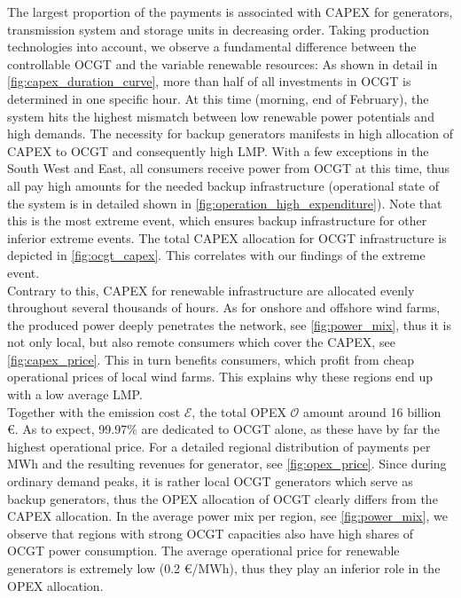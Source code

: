 \documentclass[11pt,twocolumn]{article}
\newcommand{\opex}{\mathcal{O}}
\newcommand{\emissioncost}{\mathcal{E}}
\begin{document}
The largest proportion of the payments is associated with CAPEX for generators, transmission system and storage units in decreasing order. 
Taking production technologies into account, we observe a fundamental difference between the controllable OCGT  and the variable renewable resources: As shown in detail in \cref{fig:capex_duration_curve}, more than half of all investments in OCGT is determined in one specific hour. At this time (morning, end of February), the system hits the highest mismatch between low renewable power potentials and high demands. The necessity for backup generators manifests in high allocation of CAPEX to OCGT and consequently high LMP. With a few exceptions in the South West and East, all consumers receive power from OCGT at this time, thus all pay high amounts for the needed backup infrastructure (operational state of the system is in detailed shown in \cref{fig:operation_high_expenditure}). Note that this is the most extreme event, which ensures backup infrastructure for other inferior extreme events. The total CAPEX allocation for OCGT infrastructure is depicted in \cref{fig:ocgt_capex}. This  correlates with our findings of the extreme event. \\
Contrary to this, CAPEX for renewable infrastructure are allocated evenly throughout several thousands of hours. As for onshore and offshore wind farms, the produced power deeply penetrates the network, see \cref{fig:power_mix}, thus it is not only local, but also remote consumers which cover the CAPEX, see \cref{fig:capex_price}. This in turn benefits consumers, which profit from cheap operational prices of local wind farms. This explains why these regions end up with a low average LMP.\\

Together with the emission cost $\emissioncost$, the total OPEX $\opex$ amount around 16 billion \euro. As to expect, 99.97\% are dedicated to OCGT alone, as these have by far the highest operational price. For a detailed regional distribution of payments per MWh and the resulting revenues for generator, see \cref{fig:opex_price}. Since during ordinary demand peaks, it is rather local OCGT generators which serve as backup generators, thus the OPEX allocation of OCGT clearly differs from the CAPEX allocation. In the average power mix per region, see \cref{fig:power_mix}, we observe that regions with strong OCGT capacities also  have high shares of OCGT power consumption. The average operational price for renewable generators is extremely low (0.2 \euro/MWh), thus they play an inferior role in the OPEX allocation. \\
\end{document}
